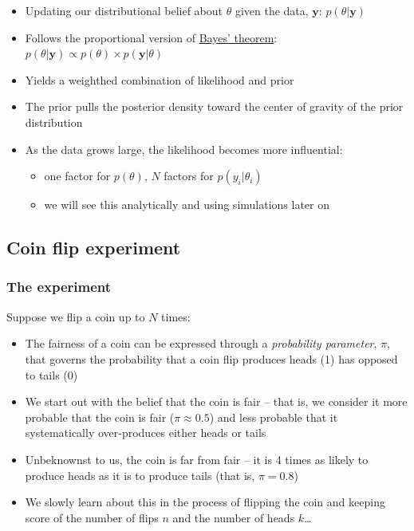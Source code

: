 \documentclass[
  11pt,
]{article}
\providecommand{\tightlist}{%
  \setlength{\itemsep}{0pt}\setlength{\parskip}{0pt}}
\begin{document}
\begin{itemize}
\tightlist
\item
  Updating our distributional belief about \(\theta\) given the data,
  \(\mathbf{y}\): \(p(\theta | \mathbf{y})\)
\item
  Follows the proportional version of \href{https://en.wikipedia.org/wiki/Bayes\%27_theorem}{Bayes'
  theorem}:
  \(p(\theta | \mathbf{y}) \propto p(\theta) \times p(\mathbf{y}|\theta)\)
\item
  Yields a weighthed combination of likelihood and prior
\item
  The prior pulls the posterior density toward the center of gravity
  of the prior distribution
\item
  As the data grows large, the likelihood becomes more influential:

  \begin{itemize}
  \tightlist
  \item
    one factor for \(p(\theta)\), \(N\) factors for \(p(y_i|\theta_i)\)
  \item
    we will see this analytically and using simulations later on
  \end{itemize}
\end{itemize}

\hypertarget{coin-flip-experiment}{%
\subsection{Coin flip experiment}\label{coin-flip-experiment}}

\hypertarget{the-experiment}{%
\subsubsection{The experiment}\label{the-experiment}}

Suppose we flip a coin up to \(N\) times:

\begin{itemize}
\tightlist
\item
  The fairness of a coin can be expressed through a \emph{probability
  parameter}, \(\pi\), that governs the probability that a coin flip
  produces heads (1) has opposed to tails (0)
\item
  We start out with the belief that the coin is fair -- that is, we
  consider it more probable that the coin is fair (\(\pi \approx 0.5\))
  and less probable that it systematically over-produces either heads
  or tails
\item
  Unbeknownst to us, the coin is far from fair -- it is 4 times as
  likely to produce heads as it is to produce tails (that is,
  \(\pi=0.8\))
\item
  We slowly learn about this in the process of flipping the coin and
  keeping score of the number of flips \(n\) and the number of heads
  \(k\)\ldots{}
\end{itemize}
\end{document}
